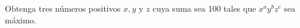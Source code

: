 \item Obtenga tres números positivos $x, y$ y $z$ cuya suma sea 100 tales que $x^a y^b z^c$ sea máximo.
